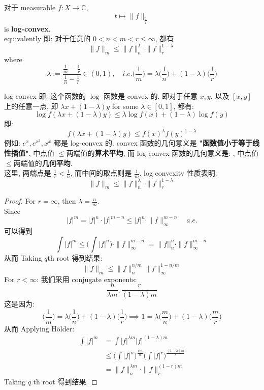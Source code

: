 \documentclass[lang=cn,11pt]{elegantbook}
\begin{document}
\begin{proposition}
对于 measurable $f: X \to \mathbb{C}$, \[
t \mapsto \| f\|_{\frac{1}{t}} 
\]is \textbf{log-convex}.\\
equivalently 即: 对于任意的 $0< n < m < r \leq \infty$, 都有 \[
\|f \|_m \leq \|f \|_n ^\lambda  \cdot \| f\|_r ^{1-\lambda}
\]
where \[
\lambda := \frac{\frac{1}{m} - \frac{1}{r}}{\frac{1}{n} - \frac{1}{r}} \in (0,1),\quad i.e. \bigg(\frac{1}{m}\bigg) = \lambda\bigg( \frac{1}{n}\bigg) + (1-\lambda) \bigg(\frac{1}{r}\bigg)
\]
\end{proposition}
\begin{remark}
    log convex 即: 这个函数的 $\log$ 函数是 convex 的. 即对于任意 $x,y$, 以及 $[x,y]$ 上的任意一点, 即 $\lambda x + (1-\lambda) y $ for some $\lambda \in [0,1]$, 都有: \[
    \log f (\lambda x + (1-\lambda) y) \leq \lambda  \log f(x) + (1-\lambda) \log f(y)
    \] 即: \[
    f (\lambda x + (1-\lambda) y)  \leq f(x)^\lambda f(y)^{1-\lambda}
    \]
例如: $e^x, e^{x^2}, x^x$ 都是 log-convex 的. convex 函数的几何意义是 \textbf{"函数值小于等于线性插值"}, 中点值 $\leq $两端值的\textbf{算术平均}, 而 log-convex 函数的几何意义是: , 中点值 $\leq $两端值的\textbf{几何平均}.\\
这里, 两端点是 $\frac{1}{r} <\frac{1}{n}$, 而中间的取点则是 $\frac{1}{m}$. log convexity 性质表明: \[
\|f \|_m \leq \|f \|_n ^\lambda  \cdot \| f\|_r ^{1-\lambda}
\]
\end{remark}
\begin{proof}
    For $r = \infty$, then $\lambda = \frac{n}{m}$.\\
    Since \[
    |f |^m  =  |f |^n \cdot | f|^{m-n} \leq |f |^n \cdot \| f\|_\infty ^{m-n} \quad a.e.
    \]
    可以得到 \[
    \int |f |^m \leq \bigg(\int |f|^n \bigg) \cdot \|f \|_\infty ^{m-n}  =  \|f ||_n ^n \cdot  \|f \|_\infty ^{m-n}
    \]
    从而 Taking $q$th root 得到结果:\[
    \| f \|_m \leq \|f \|_n ^{n/m} \|f \|_\infty ^{1-n/m}
    \]
    For $r < \infty$: 我们采用 conjugate exponents: \[
    \frac{n}{\lambda m}, \frac{r}{(1-\lambda)m}
    \]
    这是因为:  \[
     \bigg(\frac{1}{m}\bigg) = \lambda\bigg( \frac{1}{n}\bigg) + (1-\lambda) \bigg(\frac{1}{r}\bigg) \implies 1 = \lambda\bigg( \frac{m}{n}\bigg) + (1-\lambda) \bigg(\frac{m}{r}\bigg)
    \]
    从而 Applying Hölder: \begin{align*}
         \int |f|^m &= \int |f|^{\lambda m  } |f|^{(1-\lambda)m}\\
         &\leq \bigg( \int {|f|^n}\bigg)^ {\frac{\lambda m}{n}} \bigg(\int |f|^r \bigg)^{\frac{(1-\lambda)m}{r}} \\
         & = \| f\|_n ^{\lambda m} \cdot \|f \|_r ^{(1-r) m}
    \end{align*}
    Taking $q$ th root 得到结果.
\end{proof}
\end{document}
